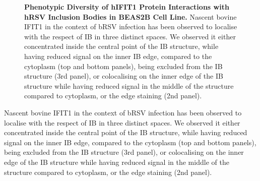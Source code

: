 \begin{figure}
\begin{subfigure}{1\textwidth}
    \end{subfigure}
    \caption[Phenotypic Diversity of hIFIT1 Protein Interactions with hRSV Inclusion Bodies in BEAS2B Cell Line]{\textbf{Phenotypic Diversity of hIFIT1 Protein Interactions with hRSV Inclusion Bodies in BEAS2B Cell Line.} Nascent bovine IFIT1 in the context of bRSV infection has been observed to localise with the respect of IB in three distinct spaces. We observed it either concentrated inside the central point of the IB structure, while having reduced signal on the inner IB edge, compared to the cytoplasm (top and bottom panels), being excluded from the IB structure (3rd panel), or colocalising on the inner edge of the IB structure while having reduced signal in the middle of the structure compared to cytoplasm, or the edge staining (2nd panel).}
    \label{fig:Phenotypic Diversity of hIFIT1 Protein Interactions with hRSV Inclusion Bodies in BEAS2B Cell Line}
\end{figure}

Nascent bovine IFIT1 in the context of bRSV infection has been observed to localise with the respect of IB in three distinct spaces. We observed it either concentrated inside the central point of the IB structure, while having reduced signal on the inner IB edge, compared to the cytoplasm (top and bottom panels), being excluded from the IB structure (3rd panel), or colocalising on the inner edge of the IB structure while having reduced signal in the middle of the structure compared to cytoplasm, or the edge staining (2nd panel).

